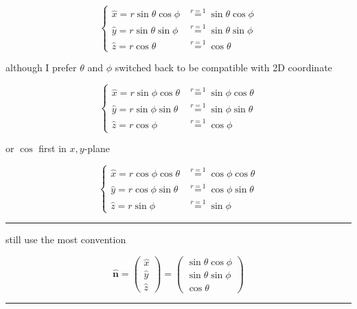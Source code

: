 \documentclass[
]{book}
\theoremstyle{definition}
\theoremstyle{definition}
\theoremstyle{definition}
\theoremstyle{definition}
\theoremstyle{remark}
\begin{document}
\[
\begin{cases}
\hat{x}=r\sin\theta\cos\phi & \overset{r=1}{=}\sin\theta\cos\phi\\
\hat{y}=r\sin\theta\sin\phi & \overset{r=1}{=}\sin\theta\sin\phi\\
\hat{z}=r\cos\theta & \overset{r=1}{=}\cos\theta
\end{cases}
\]

although I prefer \(\theta\) and \(\phi\) switched back to be compatible with 2D coordinate

\[
\begin{cases}
\hat{x}=r\sin\phi\cos\theta & \overset{r=1}{=}\sin\phi\cos\theta\\
\hat{y}=r\sin\phi\sin\theta & \overset{r=1}{=}\sin\phi\sin\theta\\
\hat{z}=r\cos\phi & \overset{r=1}{=}\cos\phi
\end{cases}
\]

or \(\cos\) first in \(x,y\)-plane

\[
\begin{cases}
\hat{x}=r\cos\phi\cos\theta & \overset{r=1}{=}\cos\phi\cos\theta\\
\hat{y}=r\cos\phi\sin\theta & \overset{r=1}{=}\cos\phi\sin\theta\\
\hat{z}=r\sin\phi & \overset{r=1}{=}\sin\phi
\end{cases}
\]

\begin{center}\rule{0.5\linewidth}{0.5pt}\end{center}

still use the most convention

\[
\hat{\boldsymbol{n}}=\begin{pmatrix}\hat{x}\\
\hat{y}\\
\hat{z}
\end{pmatrix}=\begin{pmatrix}\sin\theta\cos\phi\\
\sin\theta\sin\phi\\
\cos\theta
\end{pmatrix}
\]

\begin{center}\rule{0.5\linewidth}{0.5pt}\end{center}
\end{document}
